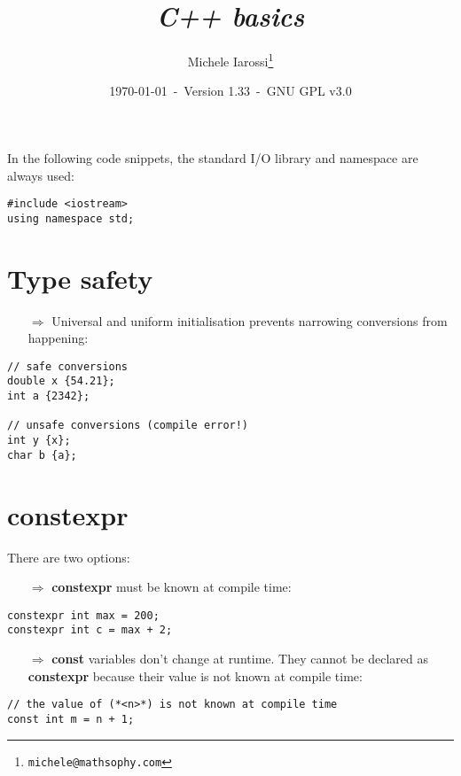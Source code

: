 \documentclass[10pt]{article}
\begin{document}
\title{\emph{C++ basics}}
\author{Michele Iarossi\thanks{\texttt{michele@mathsophy.com}}}
\date{\small \today~-~Version 1.33~-~GNU GPL v3.0}


\maketitle

\small

\begin{frame}{}
\setlength\columnsep{1cm}
\begin{multicols}{2}
\tableofcontents
\end{multicols}
\end{frame}

\noindent
In the following code snippets, the standard I/O library and namespace are always used:
\begin{lstlisting}
#include <iostream>
using namespace std;
\end{lstlisting}

\newpage
%
%
\section{Type safety}
\small
\begin{enumerate}
\item[$\Rightarrow$] Universal and uniform initialisation prevents narrowing conversions from happening:
\end{enumerate}
\begin{lstlisting}
// safe conversions
double x {54.21};
int a {2342};

// unsafe conversions (compile error!)
int y {x};
char b {a};
\end{lstlisting}
%
%
\section{constexpr}
\small
There are two options:
\begin{enumerate}
\item[$\Rightarrow$] \textbf{constexpr} must be known at compile time:
\end{enumerate}
\begin{lstlisting}
constexpr int max = 200;
constexpr int c = max + 2;
\end{lstlisting}
\begin{enumerate}
\item[$\Rightarrow$] \textbf{const} variables don't change at runtime. They cannot be declared as
\textbf{constexpr} because their value is not known at compile time:
\end{enumerate}
\begin{lstlisting}
// the value of (*<n>*) is not known at compile time
const int m = n + 1;
\end{lstlisting}
%
%
\end{document}
